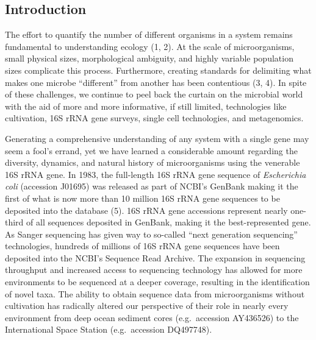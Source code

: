 \documentclass[11pt,]{article}
\begin{document}
\newpage

\subsection{Introduction}\label{introduction}

The effort to quantify the number of different organisms in a system
remains fundamental to understanding ecology (1, 2). At the scale of
microorganisms, small physical sizes, morphological ambiguity, and
highly variable population sizes complicate this process. Furthermore,
creating standards for delimiting what makes one microbe ``different''
from another has been contentious (3, 4). In spite of these challenges,
we continue to peel back the curtain on the microbial world with the aid
of more and more informative, if still limited, technologies like
cultivation, 16S rRNA gene surveys, single cell technologies, and
metagenomics.

Generating a comprehensive understanding of any system with a single
gene may seem a fool's errand, yet we have learned a considerable amount
regarding the diversity, dynamics, and natural history of microorganisms
using the venerable 16S rRNA gene. In 1983, the full-length 16S rRNA
gene sequence of \emph{Escherichia coli} (accession J01695) was released
as part of NCBI's GenBank making it the first of what is now more than
10 million 16S rRNA gene sequences to be deposited into the database
(5). 16S rRNA gene accessions represent nearly one-third of all
sequences deposited in GenBank, making it the best-represented gene. As
Sanger sequencing has given way to so-called ``next generation
sequencing'' technologies, hundreds of millions of 16S rRNA gene
sequences have been deposited into the NCBI's Sequence Read Archive. The
expansion in sequencing throughput and increased access to sequencing
technology has allowed for more environments to be sequenced at a deeper
coverage, resulting in the identification of novel taxa. The ability to
obtain sequence data from microorganisms without cultivation has
radically altered our perspective of their role in nearly every
environment from deep ocean sediment cores (e.g.~accession AY436526) to
the International Space Station (e.g.~accession DQ497748).
\end{document}
